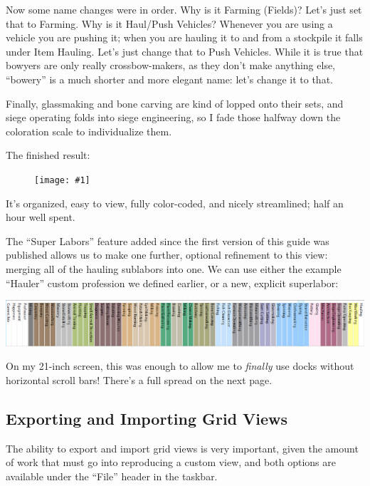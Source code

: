\documentclass[]{article}
\newcommand{\addendum}[1] {
\begin{center}
\colorbox{addendum-content}{
\begin{minipage}[t]{0.96\linewidth}
#1
\end{minipage}
}
\end{center}
}
\newcommand{\fullfigure}[1] {
\begin{figure}[h!]
\texttt{[image: \#1]}
\end{figure}
}
\begin{document}
Now some name changes were in order. Why is it Farming (Fields)? Let's just set that to Farming. Why is
it Haul/Push Vehicles? Whenever you are using a vehicle you are pushing it; when you are hauling it to
and from a stockpile it falls under Item Hauling. Let's just change that to Push Vehicles. While it is
true that bowyers are only really crossbow-makers, as they don't make anything else, ``bowery'' is a
much shorter and more elegant name: let's change it to that.
\vspace{12pt}

Finally, glassmaking and bone carving are kind of lopped onto their sets, and siege
operating folds into siege engineering, so I fade those halfway down the coloration scale to
individualize them.\vspace{12pt}

The finished result:
\fullfigure{Sec3Fig26}

It's organized, easy to view, fully color-coded, and nicely streamlined; half an hour well spent.

\addendum{

The ``Super Labors'' feature added since the first version of this guide was published allows us to make
one further, optional refinement to this view: merging all of the hauling sublabors into one. We can use
either the example ``Hauler'' custom profession we defined earlier, or a new, explicit superlabor:

\vspace{5pt}
\includegraphics[width=\linewidth]{Sec3Fig26+}
\vspace{-5pt}

On my 21-inch screen, this was enough to allow me to \emph{finally} use docks without horizontal
scroll bars! There's a full spread on the next page.

}

\subsection{Exporting and Importing Grid Views}
\label{sec:Exporting and Importing Grid Views}

The ability to export and import grid views is very important, given the amount of work that must go
into reproducing a custom view, and both options are available under the ``File'' header in the taskbar.
\end{document}
